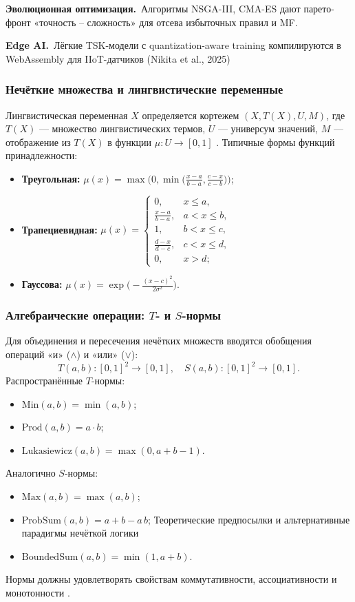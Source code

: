 \textbf{Эволюционная оптимизация.}\,
Алгоритмы NSGA-III, CMA-ES
дают парето-фронт «точность – сложность»
для отсева избыточных правил и MF.

\textbf{Edge AI.}\,
Лёгкие TSK-модели с quantization-aware training
компилируются в WebAssembly
для IIoT-датчиков (Nikita et al., 2025)

\subsubsection{Нечёткие множества и лингвистические переменные}
Лингвистическая переменная \(X\) определяется кортежем \((X, T(X), U, M)\), где \(T(X)\) --- множество лингвистических термов, \(U\) --- универсум значений, \(M\) --- отображение из \(T(X)\) в функции \(\mu:U\to[0,1]\) \cite{Zadeh1975}. Типичные формы функций принадлежности:
\begin{itemize}
  \item \textbf{Треугольная:} 
    \(\mu(x) = \max\bigl(0, \min\bigl(\tfrac{x-a}{b-a}, \tfrac{c-x}{c-b}\bigr)\bigr)\);
  \item \textbf{Трапециевидная:}
    \(\mu(x) = \begin{cases}
      0, & x \le a,\\
      \tfrac{x-a}{b-a}, & a < x \le b,\\
      1, & b < x \le c,\\
      \tfrac{d-x}{d-c}, & c < x \le d,\\
      0, & x > d;
    \end{cases}\)
  \item \textbf{Гауссова:}
    \(\mu(x) = \exp\bigl(-\tfrac{(x-c)^2}{2\sigma^2}\bigr)\).
\end{itemize}

\subsubsection{Алгебраические операции: \(T\)- и \(S\)-нормы}
Для объединения и пересечения нечётких множеств вводятся обобщения операций «и» (\(\land\)) и «или» (\(\lor\)):
\[
  T(a,b)\colon [0,1]^2\to[0,1],\quad
  S(a,b)\colon [0,1]^2\to[0,1].
\]
Распространённые \(T\)-нормы:
\begin{itemize}
  \item \(\mathrm{Min}(a,b)=\min(a,b)\);
  \item \(\mathrm{Prod}(a,b)=a\cdot b\);
  \item \(\mathrm{Lukasiewicz}(a,b)=\max(0,a+b-1)\).
\end{itemize}
Аналогично \(S\)-нормы:
\begin{itemize}
  \item \(\mathrm{Max}(a,b)=\max(a,b)\);
  \item \(\mathrm{ProbSum}(a,b)=a+b - a\,b\);
 Теоретические предпосылки и альтернативные
парадигмы нечёткой логики \item \(\mathrm{BoundedSum}(a,b)=\min(1,a+b)\).
\end{itemize}
Нормы должны удовлетворять свойствам коммутативности, ассоциативности и монотонности \cite{Klir1995}.

